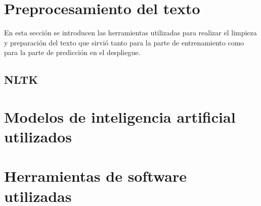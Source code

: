 \section{Preprocesamiento del texto}

En esta sección se introducen las herramientas utilizadas para realizar el limpieza y preparación del texto que sirvió tanto para la parte de entrenamiento como para la parte de predicción en el despliegue.

\subsection{NLTK}



\section{Modelos de inteligencia artificial utilizados}



\section{Herramientas de software utilizadas}